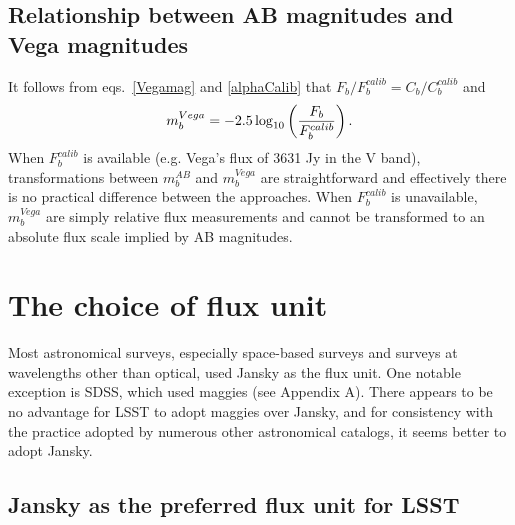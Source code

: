 \documentclass{emulateapj}
\begin{document}
\subsection{Relationship between AB magnitudes and Vega magnitudes} 

It follows from eqs.~\ref{Vegamag} and \ref{alphaCalib} that 
$F_b/F^{calib}_{b} = C_b / C_b^{calib}$ and 
\begin{equation}
\label{VegamagAB}
               m^{Vega}_b = -2.5\log_{10}\left({F_b \over F^{calib}_{b}}\right). 
\end{equation}
When $F^{calib}_{b}$ is available (e.g. Vega's flux of 3631 Jy in the V band), transformations between 
$m^{AB}_b$ and $m^{Vega}_b$ are straightforward and effectively there is no practical difference 
between the approaches. When $F^{calib}_{b}$ is unavailable, $m^{Vega}_b$ are simply relative flux measurements
and cannot be transformed to an absolute flux scale implied by AB magnitudes. 


\section{The choice of flux unit}  

Most astronomical surveys, especially space-based surveys and surveys
at wavelengths other than optical, used Jansky as the flux unit.  One notable
exception is SDSS, which used maggies (see Appendix A). There appears to be
no advantage for LSST to adopt maggies over Jansky, and for consistency
with the practice adopted by numerous other astronomical catalogs, it seems
better to adopt Jansky. 


\subsection{Jansky as the preferred flux unit for LSST  \label{sec:Jy}} 
\end{document}
